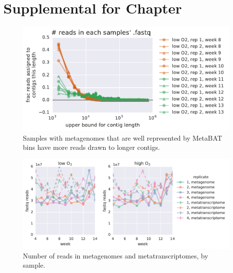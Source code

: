 \chapter{Supplemental for Chapter }


\begin{figure}[H]
\centering
    \includegraphics[width=1.0\textwidth]{./tex/chapter2/figures/170124_bad_low_o2_samples_have_more_reads_on_short_contigs--binning_not_considered.pdf}
    \begin{singlespace}
    \caption[Samples best explained by bins have more reads drawn to longer contigs]{
        Samples with metagenomes that are well represented by MetaBAT bins have more reads drawn to longer contigs.}
    \label{fig:contig_dist}
    \end{singlespace}
\end{figure}

\begin{figure}[H]
\centering
    \includegraphics[width=1.0\textwidth]{./tex/chapter2/figures/170326_compare_raw_fastq_reads.pdf}
    \begin{singlespace}
    \caption[Number of reads in metagenomes and metatranscriptomes, by sample]{
        Number of reads in metagenomes and metatranscriptomes, by sample.}
    \label{fig:fastq_reads}
    \end{singlespace}
\end{figure}

